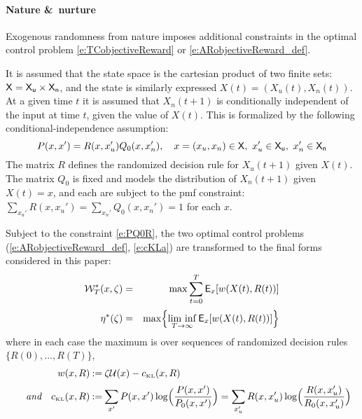 \documentclass[final,12pt]{colt2018} %
\def\util{{\mathcal{U}}}
\def\cKL{c_{\text{\tiny KL}}}
\def\reward{w}
\def\liminf{\mathop{\rm lim\ inf}}
\def\state{{\sf X}}
\def\stateu{{\sf X}_{\sf u}}
\def\staten{{\sf X}_{\sf n}}
\def\clW{{\cal W}}
\def\eqdef{\mathbin{:=}}
\def\Expect{{\sf E}}
\begin{document}


\paragraph*{Nature \&\ nurture}   

Exogenous randomness from nature imposes additional constraints in the optimal control problem  \eqref{e:TCobjectiveReward} or \eqref{e:ARobjectiveReward_def}.   

It is assumed that the state space is the cartesian product of two finite sets:  $\state= \stateu\times\staten$, and the state is similarly expressed $X(t)=(X_u(t), X_n(t))$.   At a given time $t$ it is assumed that $X_n(t+1)$ is conditionally independent of the input at time $t$,  given the value of $X(t)$.   This is formalized by the  following conditional-independence assumption: 
\begin{equation}
P(x,x') = R(x, x_u') Q_0(x,x_n') ,\quad x=(x_u,x_n) \in\state, \ x_u'\in\stateu,\ x_n'\in\staten 
\label{e:PQ0R}
\end{equation} 
The matrix $R$ defines the randomized decision rule for $X_u(t+1)$ given $X(t)$.  
The matrix $Q_0$ is fixed and models the distribution of   $X_n(t+1)$ given $X(t)=x$,
 and each are subject to the pmf constraint:
$
\sum_{x_u'} R(x, x_u')=\sum_{x_n'}  Q_0(x,x_n') =1
$
for each $x$. 

Subject to the constraint \eqref{e:PQ0R}, the two optimal control problems (\ref{e:ARobjectiveReward_def}, \ref{e:cKLa}) are transformed to  the final forms considered in this paper:
\begin{eqnarray}
\clW^*_T(x,\zeta) &=& \max \sum_{t=0}^T  \Expect_x[  \reward(X(t),R(t))   ]
\label{e:TCobjective_NN}
\\[.2em]
 \eta^*(\zeta) &=&\max\Bigl\{ \liminf_{T\to\infty}       \Expect_x[  \reward(X(t),R(t)) ]  \Bigr\}
 \label{e:ACobjective_NN}
\end{eqnarray}
where in each case the maximum is over sequences of randomized decision rules $\{R(0),\dots,R(T)\}$,     
\begin{equation} 
\begin{aligned}
 \reward(x,R)  &\eqdef \zeta \util(x) -  \cKL(x,R) 
 \\[.2em]
 \text{\it and}\quad 
\cKL(x,R)& \eqdef \sum_{x'}  P(x,x') \log \Bigl(\frac{P(x,x') }{P_0(x,x')} \Bigr)  
 =   \sum_{x'_u}  R(x,x'_u) \log \Bigl(\frac{R(x,x'_u) }{R_0(x,x_u')} \Bigr)   
\end{aligned}
\label{e:cKL}
\end{equation}
\end{document}
